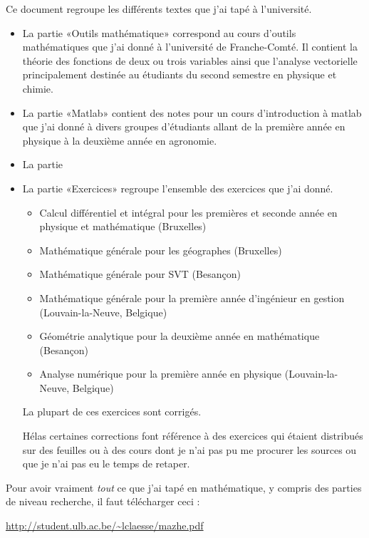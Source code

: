 Ce document regroupe les différents textes que j'ai tapé à l'université.
\begin{itemize}
    \item La partie «Outils mathématique» correspond au cours d'outils mathématiques que j'ai donné à l'université de Franche-Comté. Il contient la théorie des fonctions de deux ou trois variables ainsi que l'analyse vectorielle principalement destinée au étudiants du second semestre en physique et chimie.
    \item La partie «Matlab» contient des notes pour un cours d'introduction à matlab que j'ai donné à divers groupes d'étudiants allant de la première année en physique à la deuxième année en agronomie.

    \item La partie

    \item La partie «Exercices» regroupe l'ensemble des exercices que j'ai donné. 

        \begin{itemize}
            \item Calcul différentiel et intégral pour les premières et seconde année en physique et mathématique (Bruxelles)
            \item Mathématique générale pour les géographes (Bruxelles)
            \item Mathématique générale pour SVT (Besançon)
            \item Mathématique générale pour la première année d'ingénieur en gestion (Louvain-la-Neuve, Belgique)
            \item Géométrie analytique pour la deuxième année en mathématique (Besançon)
            \item Analyse numérique pour la première année en physique (Louvain-la-Neuve, Belgique)
        \end{itemize}
        La plupart de ces exercices sont corrigés. 

        Hélas certaines corrections font référence à des exercices qui étaient distribués sur des feuilles ou à des cours dont je n'ai pas pu me procurer les sources ou que je n'ai pas eu le temps de retaper.
\end{itemize}

\vfill

Pour avoir vraiment \emph{tout} ce que j'ai tapé en mathématique, y compris des parties de niveau recherche, il faut télécharger ceci :
\begin{center}
    \url{http://student.ulb.ac.be/~lclaesse/mazhe.pdf}
\end{center}



\clearpage
